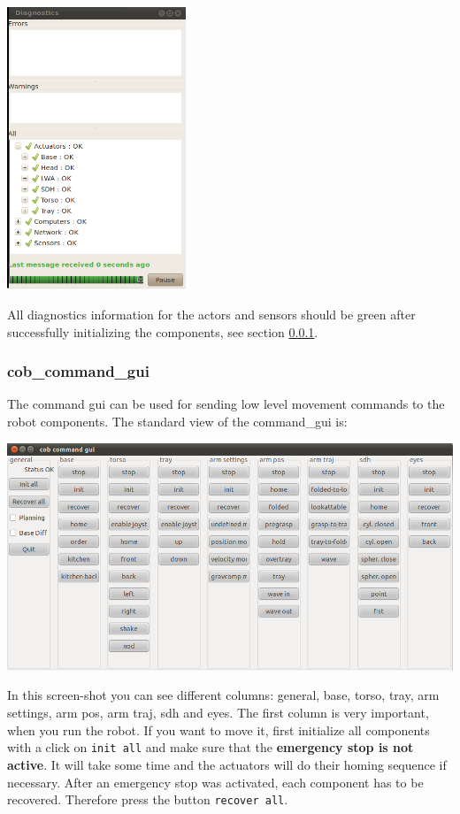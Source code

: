 \begin{center}
\includegraphics[width=0.4\textwidth]{images/diagnostics.png}
\end{center}

All diagnostics information for the actors and sensors should be green after successfully initializing the components, see section \ref{subsec:command_gui}.

\subsubsection{cob\_command\_gui}\label{subsec:command_gui}
The command gui can be used for sending low level movement commands to the robot components. The standard view of the command\_gui is:
\begin{center}
 \includegraphics[width=1\textwidth]{images/cob_command_gui.png}
\end{center}

In this screen-shot you can see different columns: general, base, torso, tray, arm settings, arm pos, arm traj, sdh and eyes. The first column is very important, when you run the robot. If you want to move it, first initialize all components with a click on \texttt{init all} and make sure that the \textbf{emergency stop is not active}. It will take some time and the actuators will do their homing sequence if necessary. After an emergency stop was activated, each component has to be recovered. Therefore press the button \texttt{recover all}. 

